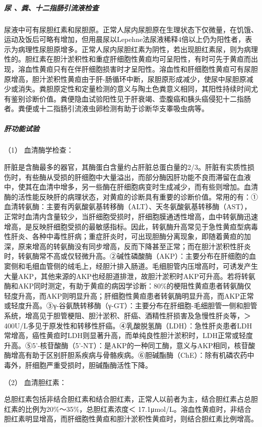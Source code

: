 \subparagraph{尿 、粪、十二指肠引流液检查}

尿液中可有尿胆红素和尿胆原。正常人尿内尿胆原在生理状态下仅微量，在饥饿、运动及饭后可略有增加，但用晨尿以Lepehne法尿液稀释4倍以上仍为阳性者，表示为病理性尿胆原增多。正常人尿内尿胆红素为阴性，若出现胆红素尿，则为病理性的。胆红素在胆汁淤积性和重症肝细胞性黄疸均可呈阳性，有时可先于黄疸而出现，溶血性黄疸只有在伴肝细胞损害时才呈阳性。溶血性和肝细胞性黄疸可有尿胆原增高，胆汁淤积性黄疸由于肝-肠循环中断，尿胆原形成减少，使尿中尿胆原减少或消失。粪胆原定性和定量检测的意义与陶土色粪意义相同，其阳性持续时间尤有鉴别诊断价值。粪便隐血试验阳性见于肝衰竭、壶腹癌和胰头癌侵犯十二指肠者。粪便或十二指肠引流液虫卵检测有助于诊断华支睾吸虫病等。

\subparagraph{肝功能试验}

\hypertarget{text00039.htmlux5cux23CHP1-16-3-4-3-1}{}
（1） 血清酶学检查：

肝脏是含酶最多的器官，其酶蛋白含量约占肝脏总蛋白量的2/3。肝脏有实质性损伤时，有些酶从受损的肝细胞中大量溢出，而部分酶因肝功能不良而滞留在血液中，使其在血清中增多，另一些酶在肝细胞病变时生成减少，而有些则增加。血清酶的活性能反映肝的病理状态，对黄疸的诊断具有重要的诊断价值。常用的有：①血清转氨酶：主要有丙氨酸氨基转移酶（ALT）、天冬氨酸氨基转移酶（AST），正常时血清内含量较少，当肝细胞受损时，肝细胞膜通透性增高，血中转氨酶迅速增高，是反映肝细胞受损的最敏感指标。因此，转氨酶升高常见于急性黄疸型病毒性肝炎、各种中毒性肝病；重症肝炎时，可出现胆酶分离现象，即随着黄疸的加深，原来增高的转氨酶没有同步增高，反而下降甚至正常；而在胆汁淤积性肝炎时，转氨酶常不高或仅轻微升高。②碱性磷酸酶（AKP）：主要分布在肝细胞的血窦侧和毛细血管侧的绒毛上，经胆汁排入肠道。毛细胆管内压增高时，可诱发产生大量AKP，其他来源的AKP也经胆道排泄，故胆汁淤积时AKP可升高。若将转氨酶和AKP同时测定，有助于黄疸的病因学诊断：80\%的梗阻性黄疸患者转氨酶仅轻度升高，而AKP则明显升高；肝细胞性黄疸患者转氨酶明显升高，而AKP正常或轻度升高。③γ-谷氨酰转移酶（γ-GT）：主要分布在肝细胞-毛细胆管一侧和胆管系统，增高见于胆管梗阻、胆汁淤积、肝癌、酒精性肝损害及急慢性肝炎等，＞
400U/L多见于原发性和转移性肝癌。④乳酸脱氢酶（LDH）：急性肝炎患者LDH常增高，癌性黄疸时LDH则显著升高，而单纯良性胆汁淤积时，LDH正常或轻度升高。⑤5'-核苷酸酶（5'-NT）：是AKP的一种同工酶，意义与AKP相同，核苷酸酶增高有助于区别肝胆系疾病与骨骼疾病。⑥胆碱酯酶（ChE）：除有机磷农药中毒外，肝细胞严重受损时，胆碱酯酶活性下降。

\hypertarget{text00039.htmlux5cux23CHP1-16-3-4-3-2}{}
（2） 血清胆红素：

总胆红素包括非结合胆红素和结合胆红素，正常人以前者为主，结合胆红素占总胆红素的比例为20\%～35\%，总胆红素浓度＜
17.1μmol/L。溶血性黄疸时，非结合胆红素明显增高，而肝细胞性黄疸和胆汁淤积性黄疸时，则结合胆红素比例增高。


